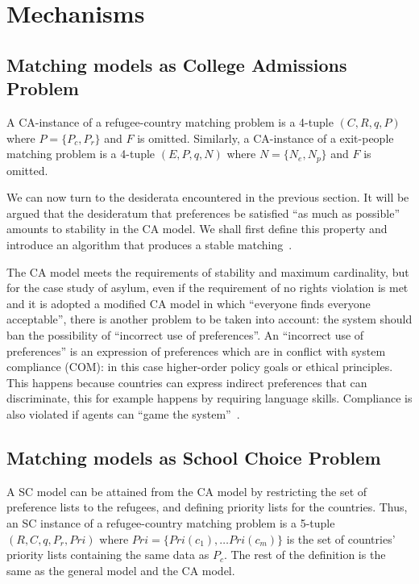\section{Mechanisms}\label{mechanisms}%


\subsection{Matching models as College Admissions Problem}\label{matching-model-as-college-admissions-problem}%

A CA-instance of a refugee-country matching problem is a 4-tuple \((C, R, q, P)\) where \(P = \{P_c, P_r\}\) and \(F\) is omitted.
Similarly, a CA-instance of a exit-people matching problem is a 4-tuple \((E, P, q, N)\) where \(N = \{N_e ,  N_p\}\) and \(F\) is omitted.

We can now turn to the desiderata encountered in the previous section.
It will be argued that the desideratum that preferences be satisfied “as much as possible” amounts to stability in the CA
model.
We shall first define this property and introduce an algorithm that produces a stable matching~\cite{basshuysen}.

The CA model meets the requirements of stability and maximum cardinality, but for the case study of asylum, even if the requirement of no rights violation is met and it is adopted a modified CA model in which “everyone finds everyone acceptable”, there is another problem to be taken into account: the system should ban the possibility of “incorrect use of preferences”.
An “incorrect use of preferences” is an expression of preferences which are in conflict with system compliance (COM): in this case higher-order policy goals or ethical principles.
This happens because countries can express indirect preferences that can discriminate, this for example happens by requiring language skills.
Compliance is also violated if agents can “game the system”~\cite{basshuysen}.


\subsection{Matching models as School Choice Problem}\label{matching-model-as-school-choice-problem}%

A SC model can be attained from the CA model by restricting the set of preference lists to the refugees, and defining priority lists for the countries.
Thus, an SC instance of a refugee-country matching problem is a 5-tuple \((R, C, q, P_r, Pri)\) where \(Pri = \{Pri(c_1), \ldots Pri(c_m)\}\) is the set of countries’ priority lists containing the same data as \(P_c\).
The rest of the definition is the same as the general model and the CA model.

